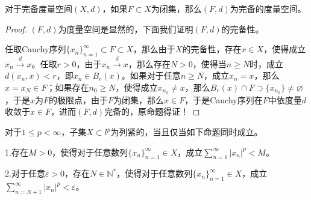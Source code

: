 \documentclass[lang = cn, scheme = chinese, 10pt]{elegantbook}
\newcommand{\N}{\mathbb{N}}  %
\newcommand{\sub}{\subset}   %
\begin{document}
\begin{proposition}
	对于完备度量空间$(X,d)$，如果$F\sub X$为闭集，那么$(F,d)$为完备的度量空间。
\end{proposition}

\begin{proof}
	$( F,d )$为度量空间是显然的，下面我们证明$( F,d )$的完备性。
	
	任取Cauchy序列$\{ x_n \}_{n=1}^{\infty}\sub F\sub X$，那么由于$X$的完备性，存在$x\in X$，使得成立$x_n\xrightarrow{d}x$。任取$r>0$，由于$x_n\xrightarrow{d}x$，那么存在$N>0$，使得当$n\ge N$时，成立$d(x_n,x)<r$，即$x_n\in B_r(x)$。如果对于任意$n\ge N$，成立$x_n=x$，那么$x=x_N\in F$；如果存在$n_0\ge N$，使得成立$x_{n_0}\ne x$，那么$B_r(x)\cap F\supset \{ x_{n_0} \}\ne\varnothing$，于是$x$为$F$的极限点，由于$F$为闭集，那么$x\in F$，于是Cauchy序列在$F$中依度量$d$收敛于$x\in F$，进而$( F,d )$完备的，原命题得证！
\end{proof}

\begin{proposition}
	对于$1\le p<\infty$，子集$X\sub l^p$为列紧的，当且仅当如下命题同时成立。
	
	1.存在$M>0$，使得对于任意数列$\{x_n\}_{n=1}^{\infty}\in X$，成立$\displaystyle\sum_{n=1}^{\infty}|x_n|^p<M$。
	
	2.对于任意$\varepsilon>0$，存在$N\in\N^*$，使得对于任意数列$\{x_n\}_{n=1}^{\infty}\in X$，成立$\displaystyle\sum_{n=N+1}^{\infty}|x_n|^p<\varepsilon$。
\end{proposition}
\end{document}
